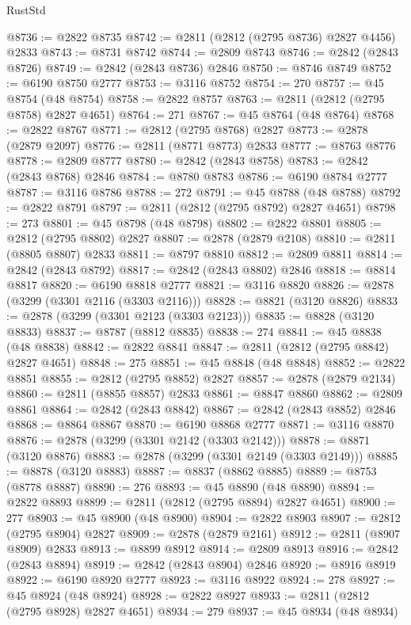 \begin{lexlean}{RustStd}
\begin{coremodule}
{\begin{coremodule}
{{{{{{{{{{{{{{{{{{{{{{{{{{{{{{{{{@8736 := @2822 @8735
@8742 := @2811 (@2812 (@2795 @8736) @2827 @4456) @2833
@8743 := @8731 @8742
@8744 := @2809 @8743
@8746 := @2842 (@2843 @8726)
@8749 := @2842 (@2843 @8736) @2846
@8750 := @8746 @8749
@8752 := @6190 @8750 @2777
@8753 := @3116 @8752
@8754 := 270
@8757 := @45 @8754 (@48 @8754)
@8758 := @2822 @8757
@8763 := @2811 (@2812 (@2795 @8758) @2827 @4651)
@8764 := 271
@8767 := @45 @8764 (@48 @8764)
@8768 := @2822 @8767
@8771 := @2812 (@2795 @8768) @2827
@8773 := @2878 (@2879 @2097)
@8776 := @2811 (@8771 @8773) @2833
@8777 := @8763 @8776
@8778 := @2809 @8777
@8780 := @2842 (@2843 @8758)
@8783 := @2842 (@2843 @8768) @2846
@8784 := @8780 @8783
@8786 := @6190 @8784 @2777
@8787 := @3116 @8786
@8788 := 272
@8791 := @45 @8788 (@48 @8788)
@8792 := @2822 @8791
@8797 := @2811 (@2812 (@2795 @8792) @2827 @4651)
@8798 := 273
@8801 := @45 @8798 (@48 @8798)
@8802 := @2822 @8801
@8805 := @2812 (@2795 @8802) @2827
@8807 := @2878 (@2879 @2108)
@8810 := @2811 (@8805 @8807) @2833
@8811 := @8797 @8810
@8812 := @2809 @8811
@8814 := @2842 (@2843 @8792)
@8817 := @2842 (@2843 @8802) @2846
@8818 := @8814 @8817
@8820 := @6190 @8818 @2777
@8821 := @3116 @8820
@8826 := @2878 (@3299 (@3301 @2116 (@3303 @2116)))
@8828 := @8821 (@3120 @8826)
@8833 := @2878 (@3299 (@3301 @2123 (@3303 @2123)))
@8835 := @8828 (@3120 @8833)
@8837 := @8787 (@8812 @8835)
@8838 := 274
@8841 := @45 @8838 (@48 @8838)
@8842 := @2822 @8841
@8847 := @2811 (@2812 (@2795 @8842) @2827 @4651)
@8848 := 275
@8851 := @45 @8848 (@48 @8848)
@8852 := @2822 @8851
@8855 := @2812 (@2795 @8852) @2827
@8857 := @2878 (@2879 @2134)
@8860 := @2811 (@8855 @8857) @2833
@8861 := @8847 @8860
@8862 := @2809 @8861
@8864 := @2842 (@2843 @8842)
@8867 := @2842 (@2843 @8852) @2846
@8868 := @8864 @8867
@8870 := @6190 @8868 @2777
@8871 := @3116 @8870
@8876 := @2878 (@3299 (@3301 @2142 (@3303 @2142)))
@8878 := @8871 (@3120 @8876)
@8883 := @2878 (@3299 (@3301 @2149 (@3303 @2149)))
@8885 := @8878 (@3120 @8883)
@8887 := @8837 (@8862 @8885)
@8889 := @8753 (@8778 @8887)
@8890 := 276
@8893 := @45 @8890 (@48 @8890)
@8894 := @2822 @8893
@8899 := @2811 (@2812 (@2795 @8894) @2827 @4651)
@8900 := 277
@8903 := @45 @8900 (@48 @8900)
@8904 := @2822 @8903
@8907 := @2812 (@2795 @8904) @2827
@8909 := @2878 (@2879 @2161)
@8912 := @2811 (@8907 @8909) @2833
@8913 := @8899 @8912
@8914 := @2809 @8913
@8916 := @2842 (@2843 @8894)
@8919 := @2842 (@2843 @8904) @2846
@8920 := @8916 @8919
@8922 := @6190 @8920 @2777
@8923 := @3116 @8922
@8924 := 278
@8927 := @45 @8924 (@48 @8924)
@8928 := @2822 @8927
@8933 := @2811 (@2812 (@2795 @8928) @2827 @4651)
@8934 := 279
@8937 := @45 @8934 (@48 @8934)
}}}}}}}}}}}}}}}}}}}}}}}}}}}}}}}}}
\end{coremodule}}
\end{coremodule}
\end{lexlean}
